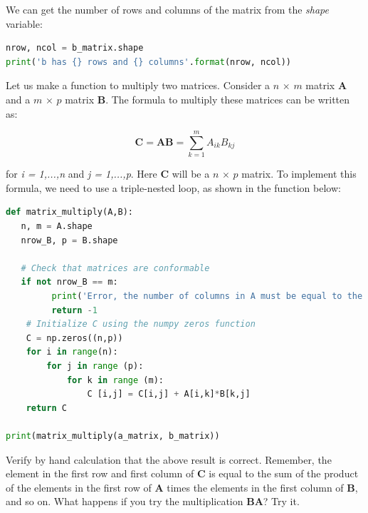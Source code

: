 \documentclass[a4paper , 12pt]{book}
\begin{document}
We can get the number of rows and columns of the matrix from the \textit{shape} variable:

\begin{center}
\begin{lstlisting}[language=Python, frame=single]
nrow, ncol = b_matrix.shape
print('b has {} rows and {} columns'.format(nrow, ncol))
\end{lstlisting}
\end{center}

Let us make a function to multiply two matrices. Consider a $n$ $\times$ $m$ matrix \textbf{A} and a $m$ $\times$ $p$ matrix \textbf{B}. The formula to multiply these matrices can be written as:

\begin{equation}
    \textbf{C} = \textbf{AB} =\sum_{k=1}^m A_{ik}B_{kj}
\end{equation}

for \textit{i = 1,...,n} and \textit{j = 1,...,p}. Here \textbf{C} will be a $n$ $\times$ $p$ matrix. To implement this formula, we need to use a triple-nested loop, as shown in the function below:

\begin{center}
\begin{lstlisting}[language=Python, frame=single]
def matrix_multiply(A,B):
   n, m = A.shape
   nrow_B, p = B.shape
   
   # Check that matrices are conformable
   if not nrow_B == m:
         print('Error, the number of columns in A must be equal to the number of rows in B!')
         return -1
    # Initialize C using the numpy zeros function
    C = np.zeros((n,p))
    for i in range(n):
        for j in range (p):
            for k in range (m):
                C [i,j] = C[i,j] + A[i,k]*B[k,j]
    return C
    
print(matrix_multiply(a_matrix, b_matrix))
\end{lstlisting}   
\end{center}

Verify by hand calculation that the above result is correct. Remember, the element in the first row and first column of \textbf{C} is equal to the sum of the product of the elements in the first row of \textbf{A} times the elements in the first column of \textbf{B}, and so on. What happens if you try the multiplication \textbf{BA}? Try it.
\end{document}
